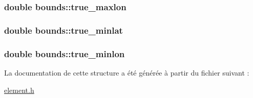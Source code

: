 \hypertarget{structbounds_aeab2523eb1b2a75d74baab3996e7be6d_aeab2523eb1b2a75d74baab3996e7be6d}{
\subsubsection[{true\-\_\-maxlon}]{\setlength{\rightskip}{0pt plus 5cm}double bounds\-::true\-\_\-maxlon}}\label{structbounds_aeab2523eb1b2a75d74baab3996e7be6d_aeab2523eb1b2a75d74baab3996e7be6d}
\hypertarget{structbounds_a889929f6ac1255785d92a87ad1299abf_a889929f6ac1255785d92a87ad1299abf}{
\subsubsection[{true\-\_\-minlat}]{\setlength{\rightskip}{0pt plus 5cm}double bounds\-::true\-\_\-minlat}}\label{structbounds_a889929f6ac1255785d92a87ad1299abf_a889929f6ac1255785d92a87ad1299abf}
\hypertarget{structbounds_aea9e0c50d8167322a532b006a41b88b7_aea9e0c50d8167322a532b006a41b88b7}{
\subsubsection[{true\-\_\-minlon}]{\setlength{\rightskip}{0pt plus 5cm}double bounds\-::true\-\_\-minlon}}\label{structbounds_aea9e0c50d8167322a532b006a41b88b7_aea9e0c50d8167322a532b006a41b88b7}


La documentation de cette structure a été générée à partir du fichier suivant \-:\begin{DoxyCompactItemize}
\item 
\hyperlink{element_8h}{element.\-h}\end{DoxyCompactItemize}
